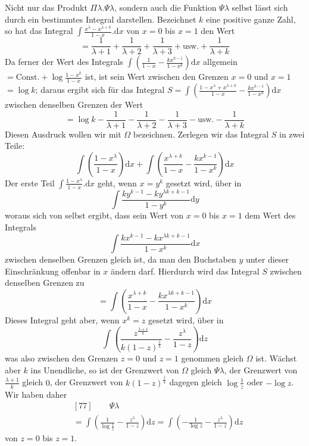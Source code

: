Nicht nur das Produkt $\Pi\lambda.\Psi\lambda$, sondern auch die Funktion $\Psi\lambda$ selbst lässt sich durch ein bestimmtes Integral darstellen. Bezeichnet $k$ eine positive ganze Zahl, so hat das Integral $\int\frac{x^\lambda-x^{\lambda+k}}{1-x}.\mathrm{d}x$ von $x=0$ bis $x=1$ den Wert
\[
=\frac{1}{\lambda+1}+\frac{1}{\lambda+2}+\frac{1}{\lambda+3}+\text{usw.}+\frac{1}{\lambda+k}
\]
Da ferner der Wert des Integrals $\int\left(\frac{1}{1-x}-\frac{kx^{k-1}}{1-x^k}\right)\mathrm{d}x$ allgemein $=\mathrm{Const.}+\log\frac{1-x^k}{1-x}$ ist, ist sein Wert zwischen den Grenzen $x=0$ und $x=1$ $=\log k$; daraus ergibt sich für das Integral $S=\int\left(\frac{1-x^\lambda+x^{\lambda+k}}{1-x}-\frac{kx^{k-1}}{1-x^k}\right)\mathrm{d}x$ zwischen denselben Grenzen der Wert
\[
=\log k-\frac{1}{\lambda+1}-\frac{1}{\lambda+2}-\frac{1}{\lambda+3}-\text{usw.}-\frac{1}{\lambda+k}
\]
Diesen Ausdruck wollen wir mit $\Omega$ bezeichnen. Zerlegen wir das Integral $S$ in zwei Teile:
\[
\int\left(\frac{1-x^\lambda}{1-x}\right)\mathrm{d}x+\int\left(\frac{x^{\lambda+k}}{1-x}-\frac{kx^{k-1}}{1-x^k}\right)\mathrm{d}x
\]
Der erste Teil $\int\frac{1-x^\lambda}{1-x}.\mathrm{d}x$ geht, wenn $x=y^k$ gesetzt wird, über in
\[
\int\frac{ky^{k-1}-ky^{\lambda k+k-1}}{1-y^k}\mathrm{d}y
\]
woraus sich von selbst ergibt, dass sein Wert von $x=0$ bis $x=1$ dem Wert des Integrals
\[
\int\frac{kx^{k-1}-kx^{\lambda k+k-1}}{1-x^k}\mathrm{d}x
\]
zwischen denselben Grenzen gleich ist, da man den Buchstaben $y$ unter dieser Einschränkung offenbar in $x$ ändern darf. Hierdurch wird das Integral $S$ zwischen denselben Grenzen zu
\[
=\int\left(\frac{x^{\lambda+k}}{1-x}-\frac{kx^{\lambda k+k-1}}{1-x^k}\right)\mathrm{d}x
\]
Dieses Integral geht aber, wenn $x^k=z$ gesetzt wird, über in
\[
\int\left(\frac{z^{\frac{\lambda+1}{k}}}{k(1-z)^{\frac{1}{k}}}-\frac{z^\lambda}{1-z}\right)\mathrm{d}z
\]
was also zwischen den Grenzen $z=0$ und $z=1$ genommen gleich $\Omega$ ist. Wächst aber $k$ ins Unendliche, so ist der Grenzwert von $\Omega$ gleich $\Psi\lambda$, der Grenzwert von $\frac{\lambda+1}{k}$ gleich $0$, der Grenzwert von $k(1-z)^{\frac{1}{k}}$ dagegen gleich $\log\frac{1}{z}$ oder $-\log z$. Wir haben daher
\[
\begin{aligned}
&[77]\qquad \Psi\lambda\\[4pt]
&=\int\left(\frac{1}{\log\frac{1}{z}}-\frac{z^\lambda}{1-z}\right)\mathrm{d}z
=\int\left(-\frac{1}{\log z}-\frac{z^\lambda}{1-z}\right)\mathrm{d}z
\end{aligned}
\]
von $z=0$ bis $z=1$.

